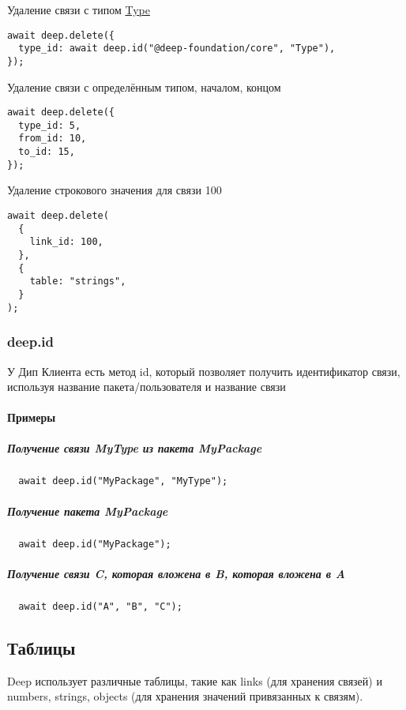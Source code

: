 \documentclass{article}
\begin{document}
Удаление связи с типом \hyperlink{Core.Type.Description}{Type}

\begin{lstlisting}
await deep.delete({
  type_id: await deep.id("@deep-foundation/core", "Type"),
});
\end{lstlisting}

Удаление связи с определённым типом, началом, концом
\begin{lstlisting}
await deep.delete({
  type_id: 5,
  from_id: 10,
  to_id: 15,
});
\end{lstlisting}

Удаление строкового значения для связи 100
\begin{lstlisting}
await deep.delete(
  {
    link_id: 100,
  },
  {
    table: "strings",
  }
);
\end{lstlisting}

\subsubsection{deep.id}
У Дип Клиента есть метод id, который позволяет получить идентификатор связи,
используя название пакета/пользователя и название связи
\paragraph{Примеры}
\subparagraph{Получение связи MyType из пакета MyPackage}
\begin{lstlisting}
  await deep.id("MyPackage", "MyType");
\end{lstlisting}

\subparagraph{Получение пакета MyPackage}
\begin{lstlisting}
  await deep.id("MyPackage");
\end{lstlisting}

\subparagraph{Получение связи C, которая вложена в B, которая вложена в A}
\begin{lstlisting}
  await deep.id("A", "B", "C");
\end{lstlisting}

\subsection{Таблицы}
Deep использует различные таблицы, такие как links (для хранения связей) и
numbers, strings, objects (для хранения значений привязанных к связям).
\end{document}
